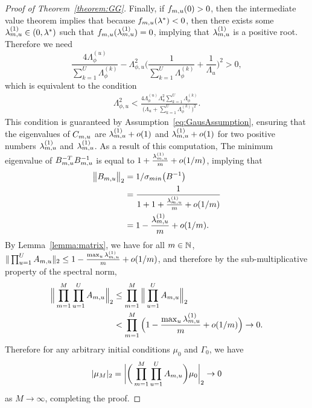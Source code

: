 \begin{proof}[Proof of Theorem~\ref{theorem:GG}]
Finally, if $f_{m, u}(0) > 0$, then the intermediate value theorem implies that because $f_{m, u}(\lambda^*) < 0$, then there exists some $\lambda^{(1)}_{m, u} \in (0, \lambda^{*})$ such that $f_{m, u}(\lambda^{(1)}_{m, u}) = 0$, implying that $\lambda^{(1)}_{m, u}$ is a positive root.
Therefore we need 
$$
\frac{4\Lambda^{(u)}_{\phi}}{\sum_{k = 1}^U\Lambda^{(k)}_{\phi}} - \Lambda_{\phi, u}^2\bigg(\frac{1}{\sum_{k = 1}^U\Lambda^{(k)}_{\phi}} + \frac{1}{\Lambda_u}\bigg)^2 > 0,
$$
which is equivalent to the condition
\begin{align*}
  \Lambda_{\phi, u}^2 < \frac{4\Lambda^{(u)}_\phi\Lambda^2_{u}\sum_{k = 1}^U \Lambda_{\phi}^{(k)}}{\big(\Lambda_u + \sum_{k = 1}^{U}\Lambda^{(k)}_{\phi}\big)^2}.
\end{align*}
This condition is guaranteed by Assumption~\ref{eq:GausAssumption}, ensuring that the eigenvalues of $C_{m, u}$ are $\lambda^{(1)}_{m, u} + o(1)$ and $\lambda^{(1)}_{m, u} + o(1)$ for two positive numbers $\lambda^{(1)}_{m, u}$ and $\lambda^{(1)}_{m, u}$.
As a result of this computation, The minimum eigenvalue of $B^{-T}_{m, u}B^{-1}_{m, u}$ is equal to $1 + \frac{\lambda^{(1)}_{m, u}}{m} + o(1/m)$, implying that 
\begin{align*}
  \big\| B_{m, u}\big\|_2 &= 1 / \sigma_{min}\big(B^{-1} \big) \\
  &= \frac{1}{1 + 1 + \frac{\lambda^{(1)}_{m, u}}{m} + o(1/m)} \\
  &= 1 - \frac{\lambda^{(1)}_{m, u}}{m} + o(1/m). 
\end{align*}
By Lemma~\ref{lemma:matrix}, we have for all $m \in \mathbb{N}$, $\|\prod_{u = 1}^U A_{m, u}\|_2 \leq 1 - \frac{\max_u \lambda^{(1)}_{m, u}}{m} + o(1/m)$, and therefore by the sub-multiplicative property of the spectral norm,
\begin{align*}
  \Big\| \prod_{m = 1}^M \prod_{u = 1}^U A_{m, u}\Big\|_2 & \leq \prod_{m = 1}^M \Big\|\prod_{u = 1}^U A_{m, u}\Big\|_2 \\
  &< \prod_{m = 1}^M \Big(1 - \frac{\max_u \lambda^{(1)}_{m, u}}{m} + o(1/m)\Big) \rightarrow 0.
\end{align*}
Therefore for any arbitrary initial conditions $\mu_0$ and $\Gamma_0$, we have
$$|\mu_M|_2 = \bigg|\bigg(\prod_{m = 1}^M\prod_{u = 1}^U A_{m, u}\bigg)\mu_0\bigg|_2 \rightarrow 0$$
as $M\rightarrow \infty$, completing the proof.

\end{proof}

